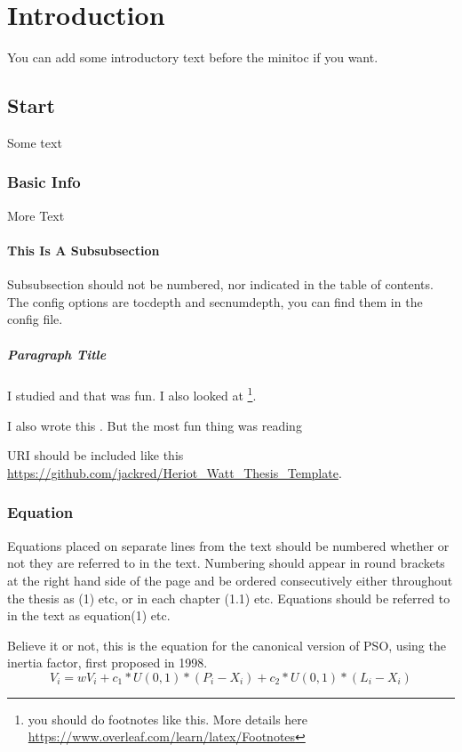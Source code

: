 \documentclass[../Thesis]{subfiles}
\begin{document}
\chapter{Introduction}

You can add some introductory text before the minitoc if you want. 

{
\minietoc
}

\section{Start}

Some text 

\subsection{Basic Info}

More Text 

\subsubsection{This Is A Subsubsection}

Subsubsection should not be numbered, nor indicated in the table of contents. The config options are tocdepth and secnumdepth, you can find them in the config file. 

\paragraph{Paragraph Title}

I studied \cite{C08} and that was fun. I also looked at \cite{C02} \footnote{you should do footnotes like this. More details here \url{https://www.overleaf.com/learn/latex/Footnotes}}.

I also wrote this \cite{C05}. But the most fun thing was reading \cite{C01}

URI should be included like this \url{https://github.com/jackred/Heriot_Watt_Thesis_Template}.

\subsection{Equation}
Equations placed on separate lines from the text should be numbered whether or not they are referred to in the text. Numbering should appear in round brackets at the right hand side of the page and be ordered consecutively either throughout the thesis as (1) etc, or in each chapter (1.1) etc. Equations should be referred to in the text as equation(1) etc.\par
\bigskip
Believe it or not, this is the equation for the canonical version of PSO, using the inertia factor, first proposed in 1998.
\begin{equation} 
    V_{i} = wV_{i} + c_{1} * U(0,1) * (P_{i} - X_{i}) + c_{2} * U(0,1) * (L_{i} - X_{i}) 
    \label{eqn:velocityInertia} 
\end{equation} 
\end{document}
